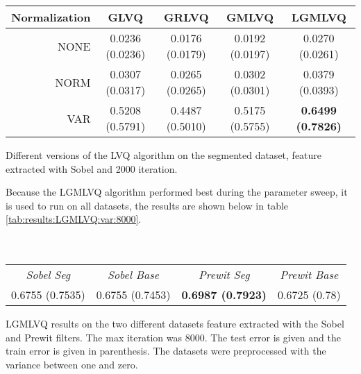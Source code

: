 \begin{minipage}{\linewidth}
\centering
{} \label{tab:results:lvq:param-sweep} 
\begin{tabular}{r|cccc}
\textbf{Normalization} & \textbf{GLVQ}                & \textbf{GRLVQ}               & \textbf{GMLVQ}               & \textbf{LGMLVQ}                    \\
\hline
\hline
NONE          & 0.0236 (0.0236) & 0.0176 (0.0179) & 0.0192 (0.0197) & 0.0270 (0.0261)\\
NORM          & 0.0307 (0.0317) & 0.0265 (0.0265) & 0.0302 (0.0301) & 0.0379 (0.0393)\\
VAR           & 0.5208 (0.5791) & 0.4487 (0.5010) & 0.5175 (0.5755) & \textbf{0.6499 (0.7826)}\\
\end{tabular}\par
\flushleft
Different versions of the LVQ algorithm on the segmented dataset, feature extracted with Sobel and 2000 iteration.
\bigskip
\end{minipage}

\noindent Because the LGMLVQ algorithm performed best during the parameter sweep, it is used to run on all datasets, the results are shown below in table \ref{tab:results:LGMLVQ:var:8000}.
\\\\\
\begin{minipage}{\linewidth}
\centering
{} \label{tab:results:LGMLVQ:var:8000} 
\begin{tabular}{cccc}
\hline
\hline
\textit{Sobel Seg} & \textit{Sobel Base} & \textit{Prewit Seg}      & \textit{Prewit Base} \\
0.6755 (0.7535)    & 0.6755 (0.7453)     & \textbf{0.6987 (0.7923)} & 0.6725 (0.78)\\
\hline
\end{tabular}\par
\flushleft
LGMLVQ results on the two different datasets feature extracted with the Sobel and Prewit filters. The max iteration was 8000. The test error is given and the train error is given in parenthesis. The datasets were preprocessed with the variance between one and zero.
\end{minipage}










